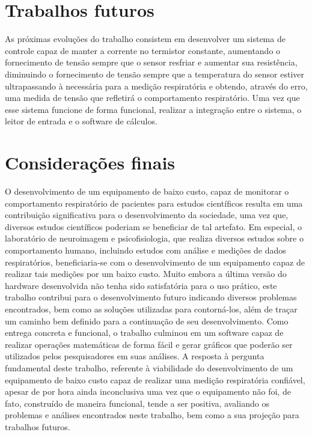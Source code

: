  \section{Trabalhos futuros}
  
  As próximas evoluções do trabalho consistem em desenvolver um sistema de controle capaz de manter a corrente no termistor constante, aumentando o fornecimento de tensão sempre que o sensor resfriar e aumentar sua resistência, diminuindo o fornecimento de tensão sempre que a temperatura do sensor estiver ultrapassando à necessária para a medição respiratória e obtendo, através do erro, uma medida de tensão que refletirá o comportamento respiratório. Uma vez que esse sistema funcione de forma funcional, realizar a integração entre o sistema, o leitor de entrada e o software de cálculos.
  
  \section{Considerações finais}
  
  O desenvolvimento de um equipamento de baixo custo, capaz de monitorar o comportamento respiratório de pacientes para estudos científicos resulta em uma contribuição significativa para o desenvolvimento da sociedade, uma vez que, diversos estudos científicos poderiam se beneficiar de tal artefato. Em especial, o laboratório de neuroimagem e psicofisiologia, que realiza diversos estudos sobre o comportamento humano, incluindo estudos com análise e medições de dados respiratórios, beneficiaria-se com o desenvolvimento de um equipamento capaz de realizar tais medições por um baixo custo.  
  Muito embora a última versão do hardware desenvolvida não tenha sido satisfatória para o uso prático, este trabalho contribui para o desenvolvimento futuro indicando diversos problemas encontrados, bem como as soluções utilizadas para contorná-los, além de traçar um caminho bem definido para a continuação de seu desenvolvimento.
  Como entrega concreta e funcional, o trabalho culminou em um software capaz de realizar operações matemáticas de forma fácil e gerar gráficos que poderão ser utilizados pelos pesquisadores em suas análises.
  A resposta à pergunta fundamental deste trabalho, referente à viabilidade do desenvolvimento de um equipamento de baixo custo capaz de realizar uma medição respiratória confiável, apesar de por hora ainda inconclusiva uma vez que o equipamento não foi, de fato, construído de maneira funcional, tende a ser positiva, avaliando os problemas e análises encontrados neste trabalho, bem como a sua projeção para trabalhos futuros.